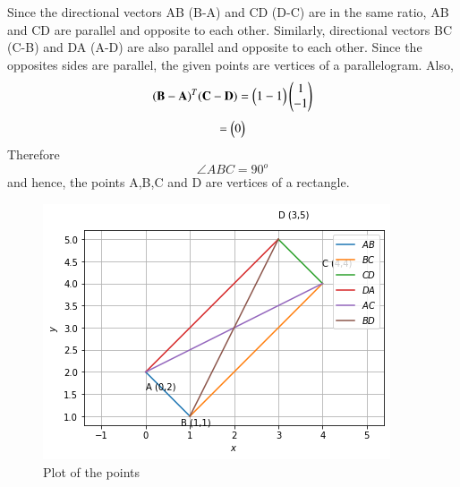 \documentclass[journal,12pt,twocolumn]{IEEEtran}
\begin{document}
Since the directional vectors AB (B-A) and CD (D-C) are in the same ratio, AB and CD are parallel and opposite to each other. Similarly, directional vectors BC (C-B) and DA (A-D) are also parallel and opposite to each other. Since the opposites sides are parallel, the given points are vertices of a parallelogram.
Also, 
\begin{align}
\mathbf{(B - A)}^T \mathbf{(C - D)} = \begin{pmatrix}1  -1\end{pmatrix} \begin{pmatrix} 1 \\ -1\end{pmatrix}
\end{align}
\begin{align}
= \begin{pmatrix}0\end{pmatrix}
\end{align}
 Therefore $$\angle ABC = 90^o$$ and hence, the points A,B,C and D are vertices of a rectangle.
 
\begin{figure}[!ht]
\centering
\includegraphics[width=\columnwidth]{plot.png}
\caption{Plot of the points}
\label{Plot}
\end{figure}
\end{document}
